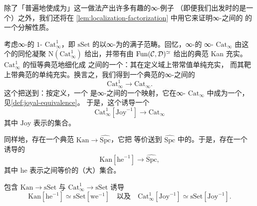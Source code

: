 除了「普遍地使\trMorphism{}成为\trInvertible{}」这一做法产出许多有趣的∞-\trCategories{}例子
（即便我们出发时的\trCategory{}是一个\trOrdinaryCategory{}）之外，我们还将在%
\cref{lem:localization-factorization} 中用它来证明∞-\trCategories{}之间的%
\trFunctor{}的一个分解性质。

\begin{example*}
考虑∞-\trCategories{}的 $1$-\trCategory{} $\mathrm{Cat}^1_{\infty}$，即
$\mathrm{sSet}$ 的以∞-\trCategories{}为\trObject{}的满子范畴。回忆，∞-\trCategories{}的
∞-\trCategory{} $\mathrm{Cat}_\infty$ 由这个\trCategory{}的同伦凝聚\trNerve{}%
$\mathrm{N}(\mathrm{Cat}^1_{\infty})$ 给出，并带有由 $\mathrm{Fun}(\mathcal{C}, \mathcal{D})^{\simeq}$
给出的典范 Kan 充实。$\mathrm{Cat}^1_{\infty}$ 的恒等典范地细化成%
\trSimplicialCategories{}之间的一个\trFunctor{}：其在定义域上带常值单纯充实，
而其靶上带典范的单纯充实。换言之，我们得到一个典范的∞-\trCategories{}之间的\trFunctor{}%
\[
\mathrm{Cat}^1_{\infty} \longrightarrow \mathrm{Cat}_{\infty}.
\]
这个\trFunctor{}把\trJoyalEquivalence{}送到\trEquivalence{}：按定义，一个%
\trJoyalEquivalence{}是∞-\trCategories{}之间的一个映射，它在∞-\trCategory{}%
$\mathrm{Cat}_\infty$ 中成为一个\trEquivalence{}，见\cref{def:joyal-equivalence}。
于是，这个\trFunctor{}诱导一个\trFunctor{}%
\[
\mathrm{Cat}^1_{\infty}[\mathrm{Joy}^{-1}] \longrightarrow \mathrm{Cat}_{\infty}
\]
其中 $\mathrm{Joy}$ 表示\trJoyalEquivalence{}的集合。
\end{example*}

\begin{example*}
同样地，存在一个典范\trFunctor{} $\mathrm{Kan} \to \widehat{\mathrm{Spc}}$，它把%
\trHomotopy{}等价送到 $\widehat{\mathrm{Spc}}$ 中的\trEquivalence{}。于是，存在一个
诱导的\trFunctor{}%
\[
\mathrm{Kan}[\mathrm{he}^{-1}] \longrightarrow \widehat{\mathrm{Spc}},
\]
其中 $\mathrm{he}$ 表示\trKanComplex{}之间\trHomotopy{}等价的（大）集合。
\end{example*}

\begin{lemma}\label{lem:inclusions-induce-equivalences}
包含 $\mathrm{Kan} \to \mathrm{sSet}$ 与 $\mathrm{Cat}^1_{\infty} \to \mathrm{sSet}$
诱导\trEquivalence{}%
\[
\mathrm{Kan}[\mathrm{he}^{-1}] \simeq \mathrm{sSet}[\mathrm{we}^{-1}]
\quad\text{以及}\quad
\mathrm{Cat}^1_{\infty}[\mathrm{Joy}^{-1}] \simeq \mathrm{sSet}[\mathrm{Joy}^{-1}].
\]
\end{lemma}

